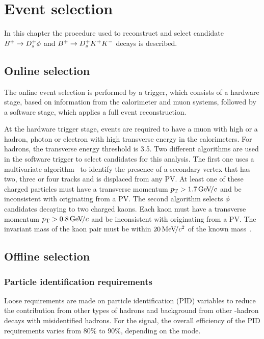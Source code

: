 \chapter{Event selection} 
\label{ch:selection}

\minitoc

In this chapter the procedure used to reconstruct and select candidate ${{{B}^+}} \rightarrow {\ensuremath{{D}^+_{s}}} \phi $ and ${{{B}^+}} \rightarrow {\ensuremath{{D}^+_{s}}} {\ensuremath{{K}^+}} {\ensuremath{{K}^-}}$ decays is described. 


\section{Online selection}

The online event selection is performed by a trigger, which consists of a hardware stage, based on information from the calorimeter and muon
systems, followed by a software stage, which applies a full event reconstruction.


At the hardware trigger stage, events are required to have a muon with high \pt or a hadron, photon or electron with high transverse energy in the calorimeters. For hadrons, the transverse energy threshold is 3.5\gev. 
Two different algorithms are used in the software trigger to select candidates for this analysis.
The first one uses a multivariate algorithm~\cite{BBDT} to identify the presence of a secondary vertex that has two, three or four tracks and is displaced from any PV. At least one of these charged particles must have a transverse momentum $\mbox{$p_{\mathrm{ T}}$} > 1.7{\mathrm{\,Ge\kern -0.1em V\!/}c}$ and be inconsistent with originating from a PV. 
The second algorithm selects $\phi$ candidates decaying to two charged kaons. Each kaon must have a transverse momentum $\mbox{$p_{\mathrm{ T}}$} > 0.8{\mathrm{\,Ge\kern -0.1em V\!/}c}$ and be inconsistent with originating from a PV. The invariant mass of the kaon pair must be within $20{\mathrm{\,Me\kern -0.1em V\!/}c^2}$ of the known \phiz mass~\cite{PDG2016}.


\section{Offline selection}
\subsection{Particle identification requirements}
Loose requirements are made on particle identification (PID) variables to reduce the contribution from other types of hadrons and background from other \bquark-hadron decays with misidentified hadrons. 
For the signal, the overall efficiency of the PID requirements varies from 80\% to 90\%, depending on the \Dsp mode.
